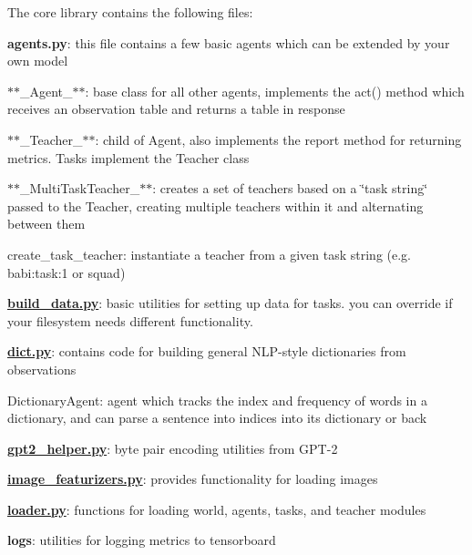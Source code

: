 The core library contains the following files\+:


\begin{DoxyItemize}
\item {\bfseries agents.\+py}\+: this file contains a few basic agents which can be extended by your own model
\begin{DoxyItemize}
\item $\ast$$\ast$\+\_\+\+Agent\+\_\+$\ast$$\ast$\+: base class for all other agents, implements the act() method which receives an observation table and returns a table in response
\item $\ast$$\ast$\+\_\+\+Teacher\+\_\+$\ast$$\ast$\+: child of Agent, also implements the report method for returning metrics. Tasks implement the Teacher class
\item $\ast$$\ast$\+\_\+\+Multi\+Task\+Teacher\+\_\+$\ast$$\ast$\+: creates a set of teachers based on a \char`\"{}task string\char`\"{} passed to the Teacher, creating multiple teachers within it and alternating between them
\item create\+\_\+task\+\_\+teacher\+: instantiate a teacher from a given task string (e.\+g. \textquotesingle{}babi\+:task\+:1\textquotesingle{} or \textquotesingle{}squad\textquotesingle{})
\end{DoxyItemize}
\item {\bfseries \hyperlink{build__data_8py}{build\+\_\+data.\+py}}\+: basic utilities for setting up data for tasks. you can override if your filesystem needs different functionality.
\item {\bfseries \hyperlink{dict_8py}{dict.\+py}}\+: contains code for building general N\+L\+P-\/style dictionaries from observations
\begin{DoxyItemize}
\item Dictionary\+Agent\+: agent which tracks the index and frequency of words in a dictionary, and can parse a sentence into indices into its dictionary or back
\end{DoxyItemize}
\item {\bfseries \hyperlink{gpt2__helper_8py}{gpt2\+\_\+helper.\+py}}\+: byte pair encoding utilities from G\+P\+T-\/2
\item {\bfseries \hyperlink{image__featurizers_8py}{image\+\_\+featurizers.\+py}}\+: provides functionality for loading images
\item {\bfseries \hyperlink{loader_8py}{loader.\+py}}\+: functions for loading world, agents, tasks, and teacher modules
\item {\bfseries logs}\+: utilities for logging metrics to tensorboard

\end{DoxyItemize}
